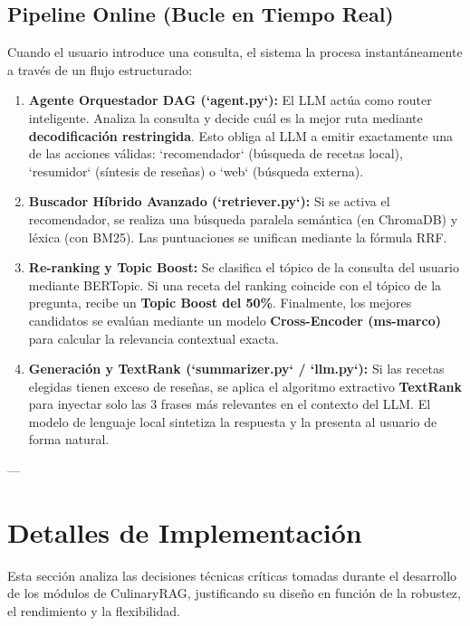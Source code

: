 \documentclass[11pt,a4paper]{article}
\begin{document}
\subsection{Pipeline Online (Bucle en Tiempo Real)}
Cuando el usuario introduce una consulta, el sistema la procesa instantáneamente a través de un flujo estructurado:
\begin{enumerate}
    \item \textbf{Agente Orquestador DAG (`agent.py`):} El LLM actúa como router inteligente. Analiza la consulta y decide cuál es la mejor ruta mediante \textbf{decodificación restringida}. Esto obliga al LLM a emitir exactamente una de las acciones válidas: `recomendador` (búsqueda de recetas local), `resumidor` (síntesis de reseñas) o `web` (búsqueda externa).
    \item \textbf{Buscador Híbrido Avanzado (`retriever.py`):} Si se activa el recomendador, se realiza una búsqueda paralela semántica (en ChromaDB) y léxica (con BM25). Las puntuaciones se unifican mediante la fórmula RRF.
    \item \textbf{Re-ranking y Topic Boost:} Se clasifica el tópico de la consulta del usuario mediante BERTopic. Si una receta del ranking coincide con el tópico de la pregunta, recibe un \textbf{Topic Boost del 50\%}. Finalmente, los mejores candidatos se evalúan mediante un modelo \textbf{Cross-Encoder (ms-marco)} para calcular la relevancia contextual exacta.
    \item \textbf{Generación y TextRank (`summarizer.py` / `llm.py`):} Si las recetas elegidas tienen exceso de reseñas, se aplica el algoritmo extractivo \textbf{TextRank} para inyectar solo las 3 frases más relevantes en el contexto del LLM. El modelo de lenguaje local sintetiza la respuesta y la presenta al usuario de forma natural.
\end{enumerate}

---

\section{Detalles de Implementación}

Esta sección analiza las decisiones técnicas críticas tomadas durante el desarrollo de los módulos de CulinaryRAG, justificando su diseño en función de la robustez, el rendimiento y la flexibilidad.
\end{document}
